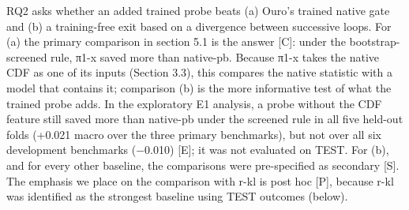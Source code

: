 RQ2 asks whether an added trained probe beats (a) Ouro's trained native gate and (b) a training-free exit based on a divergence between successive loops. For (a) the primary comparison in section 5.1 is the answer {[}C{]}: under the bootstrap-screened rule, π1-x saved more than native-pb. Because π1-x takes the native CDF as one of its inputs (Section 3.3), this compares the native statistic with a model that contains it; comparison (b) is the more informative test of what the trained probe adds. In the exploratory E1 analysis, a probe without the CDF feature still saved more than native-pb under the screened rule in all five held-out folds (+0.021 macro over the three primary benchmarks), but not over all six development benchmarks (−0.010) {[}E{]}; it was not evaluated on TEST. For (b), and for every other baseline, the comparisons were pre-specified as secondary {[}S{]}. The emphasis we place on the comparison with r-kl is post hoc {[}P{]}, because r-kl was identified as the strongest baseline using TEST outcomes (below).

\begin{table}[t]
\centering\small
\caption{TEST comparison of π1-x (macro saving 0.239) with every baseline, paired and benchmark-stratified bootstrap, 10,000 resamples {[}S{]}. The r-kl row is given to four decimals. The nine intervals are not adjusted for multiple comparisons. All baselines were selected on development data under the bootstrap-screened rule.}
\end{table}

